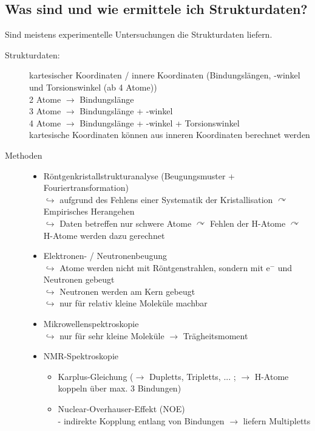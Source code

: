\documentclass[12pt,a4paper,oneside,normalheadings,abstracton,liststotoc,bibtotoc,titlepage,pdftex]{scrartcl}
\begin{document}
\subsection{Was sind und wie ermittele ich Strukturdaten?}
Sind meistens experimentelle Untersuchungen die Strukturdaten liefern.
\begin{description}
\item[Strukturdaten:] kartesischer Koordinaten / innere Koordinaten (Bindungslängen, -winkel und Torsionswinkel (ab 4 Atome))\\
2 Atome $\rightarrow$ Bindungslänge \\
3 Atome $\rightarrow$ Bindungslänge + -winkel \\
4 Atome $\rightarrow$ Bindungslänge + -winkel + Torsionswinkel \\
kartesische Koordinaten können aus inneren Koordinaten berechnet werden
\item[Methoden]
\begin{itemize}
\item Röntgenkristallstrukturanalyse (Beugungsmuster + Fouriertransformation)\\
$\hookrightarrow$ aufgrund des Fehlens einer Systematik der Kristallisation $\curvearrowright$ Empirisches Herangehen \\
$\hookrightarrow$ Daten betreffen nur schwere Atome $\curvearrowright$ Fehlen der H-Atome $\curvearrowright$  H-Atome werden dazu gerechnet 
\item Elektronen- / Neutronenbeugung\\
$\hookrightarrow$ Atome werden nicht mit Röntgenstrahlen, sondern mit e$^-$ und Neutronen gebeugt\\
$\hookrightarrow$ Neutronen werden am Kern gebeugt\\
$\hookrightarrow$ nur für relativ kleine Moleküle machbar
\item Mikrowellenspektroskopie\\
$\hookrightarrow$ nur für sehr kleine Moleküle $\rightarrow$ Trägheitsmoment\\
\item NMR-Spektroskopie
\begin{itemize}
\item Karplus-Gleichung ($\rightarrow$ Dupletts, Tripletts, ... ; $\rightarrow$ H-Atome koppeln über max. 3 Bindungen)
\item Nuclear-Overhauser-Effekt (NOE)\\
- indirekte Kopplung entlang von Bindungen $\rightarrow$ liefern Multipletts\\

\end{itemize}
\end{itemize}
\end{description}
\end{document}
